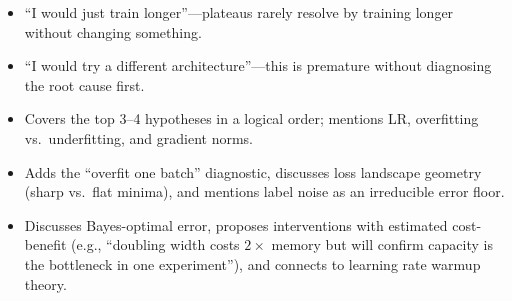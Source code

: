 \begin{interviewq}
\redflags
\begin{itemize}
    \item ``I would just train longer''---plateaus rarely resolve by training longer without changing something.
    \item ``I would try a different architecture''---this is premature without diagnosing the root cause first.
\end{itemize}


\goodgreat
\begin{itemize}
    \item {} Covers the top 3--4 hypotheses in a logical order; mentions LR, overfitting vs.\ underfitting, and gradient norms.
    \item {} Adds the ``overfit one batch'' diagnostic, discusses loss landscape geometry (sharp vs.\ flat minima), and mentions label noise as an irreducible error floor.
    \item {} Discusses Bayes-optimal error, proposes interventions with estimated cost-benefit (e.g., ``doubling width costs $2\times$ memory but will confirm capacity is the bottleneck in one experiment''), and connects to learning rate warmup theory.
\end{itemize}

\end{interviewq}


